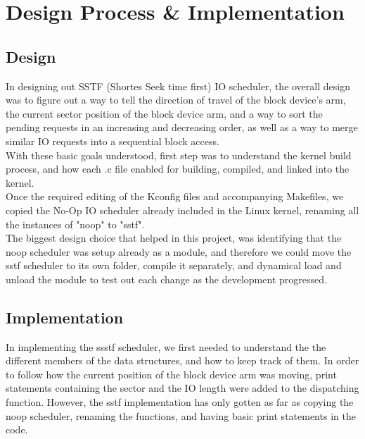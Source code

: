 \documentclass[letterpaper,10pt,titlepage]{article}
\begin{document}
%
%

\section{Design Process \& Implementation}
\subsection*{Design}

In designing out SSTF (Shortes Seek time first) IO scheduler, the overall design was to figure out a way to tell the direction of travel of the block device's arm, the current sector position of the block device arm, and a way to sort the pending requests in an increasing and decreasing order, as well as a way to merge similar IO requests into a sequential block access.\\

With these basic goals understood, first step was to understand the kernel build process, and how each .c file enabled for building, compiled, and linked into the kernel.\\

Once the required editing of the Kconfig files and accompanying Makefiles, we copied the No-Op IO scheduler already included in the Linux kernel, renaming all the instances of "noop" to "sstf". \\

The biggest design choice that helped in this project, was identifying that the noop scheduler was setup already as a module, and therefore we could move the sstf scheduler to its own folder, compile it separately, and dynamical load and unload the module to test out each change as the development progressed.

\subsection*{Implementation}

In implementing the ssstf scheduler, we first needed to understand the the different members of the data structures, and how to keep track of them. In order to follow how the current position of the block device arm was moving, print statements containing the sector and the IO length were added to the dispatching function. However, the sstf implementation has only gotten as far as copying the noop scheduler, renaming the functions, and having basic print statements in the code.
\end{document}

